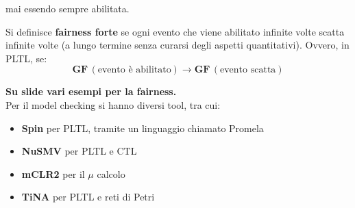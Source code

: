 \documentclass[a4paper,12pt, oneside]{book}
\begin{document}
mai essendo sempre abilitata.
\begin{definizione}
  Si definisce \textbf{fairness forte} se ogni evento che viene abilitato
  infinite volte scatta infinite volte (a lungo termine senza curarsi degli
  aspetti quantitativi). Ovvero, in PLTL, se:
  \[\mathbf{GF}\,(\mbox{evento è abilitato})\to\mathbf{GF}\,(\mbox{evento
      scatta})\] 
\end{definizione}
\textbf{Su slide vari esempi per la fairness.}\\
Per il model checking si hanno diversi tool, tra cui:
\begin{itemize}
  \item \textbf{Spin} per PLTL, tramite un linguaggio chiamato Promela
  \item \textbf{NuSMV} per PLTL e CTL
  \item \textbf{mCLR2} per il $\mu$ calcolo
  \item \textbf{TiNA} per PLTL e reti di Petri
\end{itemize}
\end{document}
